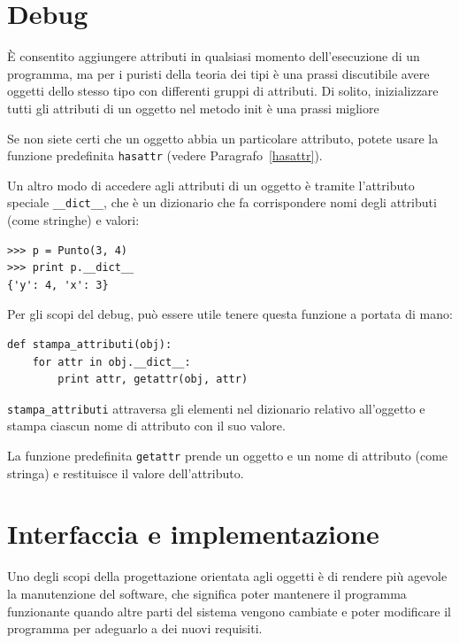\documentclass[10pt]{book}
\begin{document}
\section{Debug}

È consentito aggiungere attributi in qualsiasi momento dell'esecuzione di un programma, ma per i puristi della teoria dei tipi è una prassi discutibile avere oggetti dello stesso tipo con differenti gruppi di attributi. Di solito, inizializzare tutti gli attributi di un oggetto nel metodo init è una prassi migliore

Se non siete certi che un oggetto abbia un particolare attributo, potete usare la funzione predefinita {\tt hasattr} (vedere Paragrafo~\ref{hasattr}).

Un altro modo di accedere agli attributi di un oggetto è tramite l'attributo speciale \verb"__dict__", che è un dizionario che fa corrispondere nomi degli attributi (come stringhe) e valori:

\begin{verbatim}
>>> p = Punto(3, 4)
>>> print p.__dict__
{'y': 4, 'x': 3}
\end{verbatim}
%
Per gli scopi del debug, può essere utile tenere questa funzione a portata di mano:

\begin{verbatim}
def stampa_attributi(obj):
    for attr in obj.__dict__:
        print attr, getattr(obj, attr)
\end{verbatim}
%
\verb"stampa_attributi" attraversa gli elementi nel dizionario relativo all'oggetto e stampa ciascun nome di attributo con il suo valore.

La funzione predefinita {\tt getattr} prende un oggetto e un nome di attributo (come stringa) e restituisce il valore dell'attributo.


\section{Interfaccia e implementazione}

Uno degli scopi della progettazione orientata agli oggetti è di rendere più agevole la manutenzione del software, che significa poter mantenere il programma funzionante quando altre parti del sistema vengono cambiate e poter modificare il programma per adeguarlo a dei nuovi requisiti.
\end{document}
